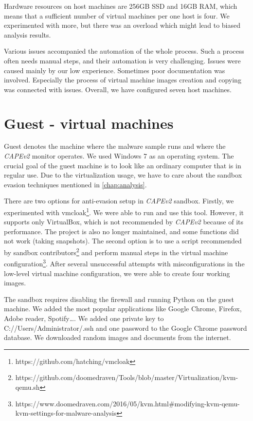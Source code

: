 Hardware resources on host machines are 256GB SSD and 16GB RAM, which means that a sufficient number of virtual machines per one host is four. We experimented with more, but there was an overload which might lead to biased analysis results.

Various issues accompanied the automation of the whole process. Such a process often needs manual steps, and their automation is very challenging. Issues were caused mainly by our low experience. Sometimes poor documentation was involved. Especially the process of virtual machine images creation and copying was connected with issues. Overall, we have configured seven host machines.

\section{Guest - virtual machines}
Guest denotes the machine where the malware sample runs and where the \emph{CAPEv2} monitor operates. We used Windows 7 as an operating system. The crucial goal of the guest machine is to look like an ordinary computer that is in regular use. Due to the virtualization usage, we have to care about the sandbox evasion techniques mentioned in \ref{chap:analysis}.

There are two options for anti-evasion setup in \emph{CAPEv2} sandbox. Firstly, we experimented with vmcloak\footnote{https://github.com/hatching/vmcloak}. We were able to run and use this tool. However, it supports only VirtualBox, which is not recommended by \emph{CAPEv2} because of its performance. The project is also no longer maintained, and some functions did not work (taking snapshots). The second option is to use a script recommended by sandbox contributors\footnote{https://github.com/doomedraven/Tools/blob/master/Virtualization/kvm-qemu.sh} and perform manual steps in the virtual machine configuration\footnote{https://www.doomedraven.com/2016/05/kvm.html\#modifying-kvm-qemu-kvm-settings-for-malware-analysis}. After several unsuccessful attempts with misconfigurations in the low-level virtual machine configuration, we were able to create four working images.

The sandbox requires disabling the firewall and running Python on the guest machine. We added the most popular applications like Google Chrome, Firefox, Adobe reader, Spotify\dots. We added one private key to C://Users/Administrator/.ssh and one password to the Google Chrome password database. We downloaded random images and documents from the internet.

